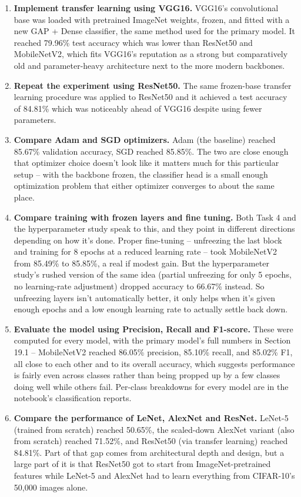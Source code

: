 \documentclass[11pt]{article}
\begin{document}
\begin{enumerate}

\item \textbf{Implement transfer learning using VGG16.} VGG16's convolutional
base was loaded with pretrained ImageNet weights, frozen, and fitted with a
new GAP + Dense classifier, the same method used for the primary model. It
reached 79.96\% test accuracy which was lower than ResNet50 and
MobileNetV2, which fits VGG16's reputation as a strong but comparatively
old and parameter-heavy architecture next to the more modern backbones.

\item \textbf{Repeat the experiment using ResNet50.} The same frozen-base
transfer learning procedure was applied to ResNet50 and it achieved a test accuracy of 84.81\% which was noticeably ahead of VGG16 despite using
fewer parameters.

\item \textbf{Compare Adam and SGD optimizers.} Adam (the baseline)
reached 85.67\% validation accuracy, SGD reached 85.85\%. The two are close
enough that optimizer choice doesn't look like it matters much for this
particular setup -- with the backbone frozen, the classifier head is a small
enough optimization problem that either optimizer converges to about the
same place.

\item \textbf{Compare training with frozen layers and fine tuning.} Both
Task 4 and the hyperparameter study speak to this, and they point in
different directions depending on how it's done. Proper fine-tuning --
unfreezing the last block and training for 8 epochs at a reduced learning
rate -- took MobileNetV2 from 85.49\% to 85.85\%, a real if modest gain. But
the hyperparameter study's rushed version of the same idea (partial
unfreezing for only 5 epochs, no learning-rate adjustment) dropped accuracy
to 66.67\% instead. So unfreezing layers isn't automatically better, it only
helps when it's given enough epochs and a low enough learning rate to
actually settle back down.

\item \textbf{Evaluate the model using Precision, Recall and F1-score.}
These were computed for every model, with the primary model's full numbers
in Section 19.1 -- MobileNetV2 reached 86.05\% precision, 85.10\% recall, and
85.02\% F1, all close to each other and to its overall accuracy, which
suggests performance is fairly even across classes rather than being
propped up by a few classes doing well while others fail. Per-class
breakdowns for every model are in the notebook's classification reports.

\item \textbf{Compare the performance of LeNet, AlexNet and ResNet.} LeNet-5
(trained from scratch) reached 50.65\%, the scaled-down AlexNet variant
(also from scratch) reached 71.52\%, and ResNet50 (via transfer learning)
reached 84.81\%. Part of that gap comes from architectural depth and
design, but a large part of it is that ResNet50 got to start from
ImageNet-pretrained features while LeNet-5 and AlexNet had to learn
everything from CIFAR-10's 50,000 images alone.

\end{enumerate}
\end{document}
